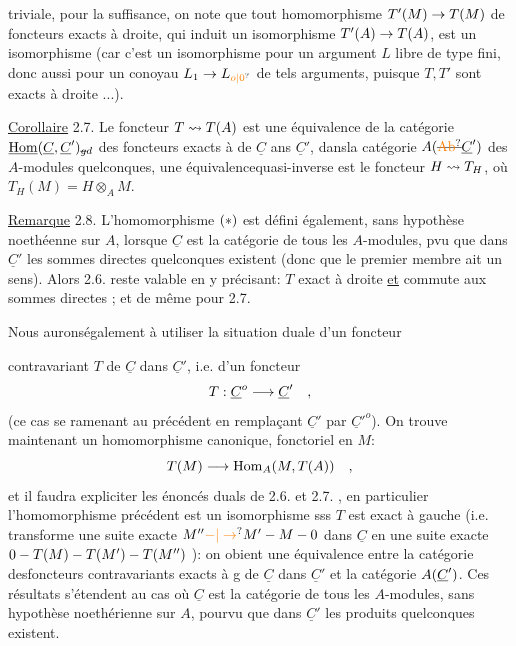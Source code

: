  triviale, pour la suffisance, on note que tout homomorphisme  $T'(M)\to T(M)$ de foncteurs exacts à droite, qui induit un isomorphisme $T'(A)\to T(A)$, est un isomorphisme  (car c'est un isomorphisme
pour un argument $L$ libre de type fini, donc aussi pour un conoyau
$L_1\handwritten{\to}L_{\unsure{o|0}}$ de tels arguments, puisque $T,T'$ sont exacts à droite ...).

\uline{Corollaire} 2.7. Le foncteur $T\leadsto T(A)$ est une équivalence de la catégorie
 $\underline{\operatorname{Hom}}(\underline C,\underline C')_{\deleted{g}d}$ des foncteurs exacts à  de $\underline C$ ans $\underline C'$, dans\handwritten{\unsure{/}}la
catégorie $A(\deleted{\unsure{\mathrm{Ab}}}\handwritten{\underline C'})$ des $A$-modules quelconques, une équivalence\handwritten{\unsure{/}}quasi-inverse
est le foncteur $H\leadsto T_H$, où $T_H(M)=H\otimes_A M$.

\uline{Remarque} 2.8. L'homomorphisme $(*)$ est défini également, sans hypothèse
noethéenne sur $A$, lorsque $\underline C$ est la catégorie de tous les $A$-modules,
pvu que dans $\underline C'$ les sommes directes quelconques existent (donc que
le premier membre ait un sens). Alors 2.6.  reste valable en y
précisant: $T$ exact à droite \uline{et} commute aux sommes directes ; et de même
pour 2.7.

Nous auronségalement à utiliser la situation duale d'un foncteur

contravariant $T$ de $\underline C$ dans $\underline C'$, i.e. d'un foncteur
\[
T:\underline C^{o}\longrightarrow\underline C'\quad,
\]
(ce cas se ramenant au précédent en remplaçant $\underline C'$ par $ {\underline C'}^{o}$). On trouve
maintenant un homomorphisme canonique, fonctoriel en $M$:
\[
T(M)\longrightarrow\operatorname{Hom}_A(M,T(A))\quad,
\]
et il faudra expliciter les énoncés duals de 2.6. et 2.7. , en particulier
l'homomorphisme précédent est un isomorphisme sss $T$ est exact à gauche
(i.e. transforme une suite exacte $M''\handwritten{\unsure{-|\to}}M'\handwritten{-}M\handwritten{-}0$ dans $\underline C$ en une suite
exacte $0-T(M)-T(M')-T(M'')$ ): on obient une équivalence entre la
catégorie des\handwritten{\unsure{/}}foncteurs contravariants exacts à g de $\underline C$ dans $\underline C'$ et la
catégorie $A(\underline C')$. Ces résultats s'étendent  au cas où $\underline C$ est la catégorie de
tous les $A$-modules, sans hypothèse noethérienne sur $A$, pourvu que dans $\underline C'$
les produits quelconques existent.


